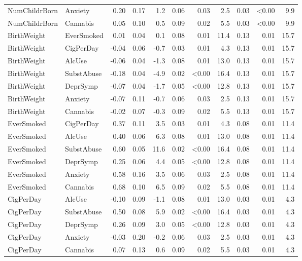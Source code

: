 {\begin{longtable}{llrrrrrrrrr}
NumChildrBorn & Anxiety & 0.20 & 0.17 & 1.2 & 0.06 & 0.03 & 2.5 & 0.03 & \textless 0.00 & 9.9 \\ 
NumChildrBorn & Cannabis & 0.05 & 0.10 & 0.5 & 0.09 & 0.02 & 5.5 & 0.03 & \textless 0.00 & 9.9 \\ 
BirthWeight & EverSmoked & 0.01 & 0.04 & 0.1 & 0.08 & 0.01 & 11.4 & 0.13 & 0.01 & 15.7 \\ 
BirthWeight & CigPerDay & -0.04 & 0.06 & -0.7 & 0.03 & 0.01 & 4.3 & 0.13 & 0.01 & 15.7 \\ 
BirthWeight & AlcUse & -0.06 & 0.04 & -1.3 & 0.08 & 0.01 & 13.0 & 0.13 & 0.01 & 15.7 \\ 
BirthWeight & SubstAbuse & -0.18 & 0.04 & -4.9 & 0.02 & \textless 0.00 & 16.4 & 0.13 & 0.01 & 15.7 \\ 
BirthWeight & DeprSymp & -0.07 & 0.04 & -1.7 & 0.05 & \textless 0.00 & 12.8 & 0.13 & 0.01 & 15.7 \\ 
BirthWeight & Anxiety & -0.07 & 0.11 & -0.7 & 0.06 & 0.03 & 2.5 & 0.13 & 0.01 & 15.7 \\ 
BirthWeight & Cannabis & -0.02 & 0.07 & -0.3 & 0.09 & 0.02 & 5.5 & 0.13 & 0.01 & 15.7 \\ 
EverSmoked & CigPerDay & 0.37 & 0.11 & 3.5 & 0.03 & 0.01 & 4.3 & 0.08 & 0.01 & 11.4 \\ 
EverSmoked & AlcUse & 0.40 & 0.06 & 6.3 & 0.08 & 0.01 & 13.0 & 0.08 & 0.01 & 11.4 \\ 
EverSmoked & SubstAbuse & 0.60 & 0.05 & 11.6 & 0.02 & \textless 0.00 & 16.4 & 0.08 & 0.01 & 11.4 \\ 
EverSmoked & DeprSymp & 0.25 & 0.06 & 4.4 & 0.05 & \textless 0.00 & 12.8 & 0.08 & 0.01 & 11.4 \\ 
EverSmoked & Anxiety & 0.58 & 0.16 & 3.5 & 0.06 & 0.03 & 2.5 & 0.08 & 0.01 & 11.4 \\ 
EverSmoked & Cannabis & 0.68 & 0.10 & 6.5 & 0.09 & 0.02 & 5.5 & 0.08 & 0.01 & 11.4 \\ 
CigPerDay & AlcUse & -0.10 & 0.09 & -1.1 & 0.08 & 0.01 & 13.0 & 0.03 & 0.01 & 4.3 \\ 
CigPerDay & SubstAbuse & 0.50 & 0.08 & 5.9 & 0.02 & \textless 0.00 & 16.4 & 0.03 & 0.01 & 4.3 \\ 
CigPerDay & DeprSymp & 0.26 & 0.09 & 3.0 & 0.05 & \textless 0.00 & 12.8 & 0.03 & 0.01 & 4.3 \\ 
CigPerDay & Anxiety & -0.03 & 0.20 & -0.2 & 0.06 & 0.03 & 2.5 & 0.03 & 0.01 & 4.3 \\ 
CigPerDay & Cannabis & 0.07 & 0.13 & 0.6 & 0.09 & 0.02 & 5.5 & 0.03 & 0.01 & 4.3 \\ 

\end{longtable}}
